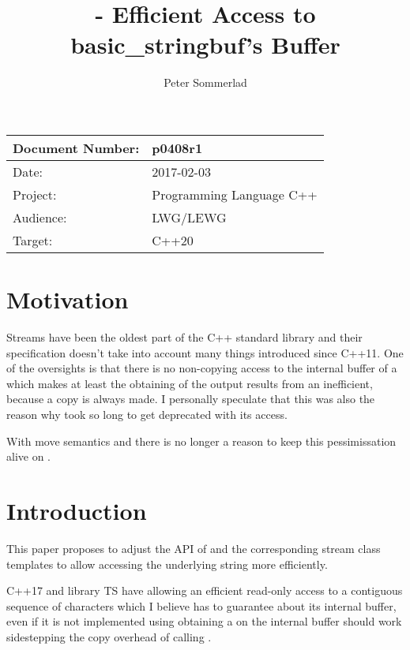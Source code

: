 \documentclass[ebook,11pt,article]{memoir}
\title{\papernumber{} - Efficient Access to basic\_stringbuf's Buffer}
\author{Peter Sommerlad}
\date{\paperdate}                        %
\newcommand{\papernumber}{p0408r1}
\newcommand{\paperdate}{2017-02-03}
\begin{document}
\maketitle
\begin{tabular}[t]{|l|l|}\hline 
Document Number: & \papernumber  \\\hline
Date: & \paperdate \\\hline
Project: & Programming Language C++\\\hline 
Audience: & LWG/LEWG\\\hline
Target: & C++20\\\hline
\end{tabular}

\chapter{Motivation}
Streams have been the oldest part of the C++ standard library and their specification doesn't take into account many things introduced since C++11. One of  the oversights is that there is no non-copying access to the internal buffer of a  which makes at least the obtaining of the output results from an  inefficient, because a copy is always made. I personally speculate that this was also the reason why  took so long to get deprecated with its  access.

With move semantics and  there is no longer a reason to keep this pessimissation alive on .


\chapter{Introduction}
This paper proposes to adjust the API of  and the corresponding stream class templates to allow accessing the underlying string more efficiently.

C++17 and library TS have  allowing an efficient read-only access to a contiguous sequence of characters which I believe  has to guarantee about its internal buffer, even if it is not implemented using  obtaining a  on the internal buffer should work sidestepping the copy overhead of calling . 
\end{document}
